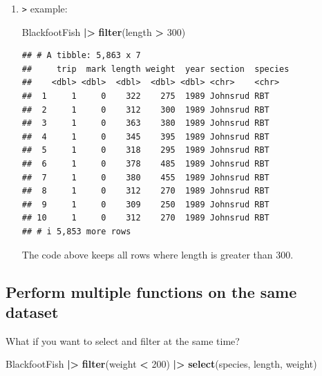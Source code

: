 \documentclass[
  10pt,
  letterpaper,
  twoside,
  openright]{book}
\newenvironment{Shaded}{\begin{snugshade}}{\end{snugshade}}
\newcommand{\DecValTok}[1]{\textcolor[rgb]{0.00,0.00,0.81}{#1}}
\newcommand{\FunctionTok}[1]{\textcolor[rgb]{0.13,0.29,0.53}{\textbf{#1}}}
\newcommand{\NormalTok}[1]{#1}
\newcommand{\SpecialCharTok}[1]{\textcolor[rgb]{0.81,0.36,0.00}{\textbf{#1}}}
\begin{document}
\begin{enumerate}
  The code above keeps all rows where weight is less than 200.
\item
  \texttt{\textgreater{}} example:

\begin{Shaded}
\begin{Highlighting}[]
\NormalTok{BlackfootFish }\SpecialCharTok{|\textgreater{}}
  \FunctionTok{filter}\NormalTok{(length }\SpecialCharTok{\textgreater{}} \DecValTok{300}\NormalTok{)}
\end{Highlighting}
\end{Shaded}

\begin{verbatim}
## # A tibble: 5,863 x 7
##     trip  mark length weight  year section  species
##    <dbl> <dbl>  <dbl>  <dbl> <dbl> <chr>    <chr>  
##  1     1     0    322    275  1989 Johnsrud RBT    
##  2     1     0    312    300  1989 Johnsrud RBT    
##  3     1     0    363    380  1989 Johnsrud RBT    
##  4     1     0    345    395  1989 Johnsrud RBT    
##  5     1     0    318    295  1989 Johnsrud RBT    
##  6     1     0    378    485  1989 Johnsrud RBT    
##  7     1     0    380    455  1989 Johnsrud RBT    
##  8     1     0    312    270  1989 Johnsrud RBT    
##  9     1     0    309    250  1989 Johnsrud RBT    
## 10     1     0    312    270  1989 Johnsrud RBT    
## # i 5,853 more rows
\end{verbatim}

  The code above keeps all rows where length is greater than 300.
\end{enumerate}

\hypertarget{perform-multiple-functions-on-the-same-dataset}{%
\subsection{Perform multiple functions on the same
dataset}\label{perform-multiple-functions-on-the-same-dataset}}

What if you want to select and filter at the same time?

\begin{Shaded}
\begin{Highlighting}[]
\NormalTok{BlackfootFish }\SpecialCharTok{|\textgreater{}}
  \FunctionTok{filter}\NormalTok{(weight }\SpecialCharTok{\textless{}} \DecValTok{200}\NormalTok{) }\SpecialCharTok{|\textgreater{}}
  \FunctionTok{select}\NormalTok{(species, length, weight)}
\end{Highlighting}
\end{Shaded}
\end{document}
